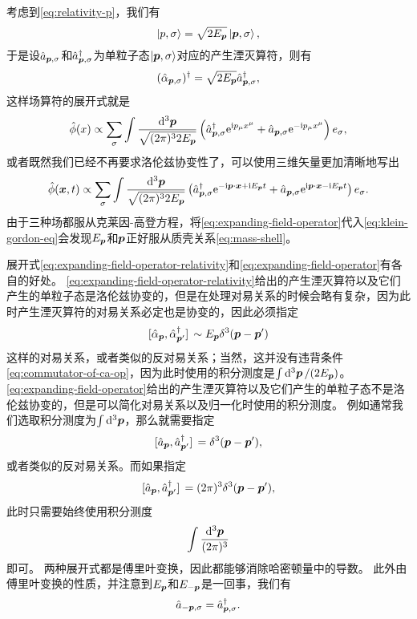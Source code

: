 \documentclass[hyperref, UTF8, a4paper]{ctexart}
\newcommand*{\ii}{\mathrm{i}}
\newcommand*{\ee}{\mathrm{e}}
\begin{document}
考虑到\eqref{eq:relativity-p}，我们有
\[
    \ket{p, \sigma} = \sqrt{2 E_{\vb*{p}}} \ket{\vb*{p}, \sigma},
\]
于是设$\hat{a}_{\vb*{p}, \sigma}$和$\hat{a}^\dagger_{\vb*{p}, \sigma}$为单粒子态$\ket{\vb*{p}, \sigma}$对应的产生湮灭算符，则有
\[
    (\hat{\alpha}_{\vb*{p}, \sigma})^\dagger = \sqrt{2E_{\vb*{p}}} \hat{a}_{\vb*{p}, \sigma}^\dagger,
\]
这样场算符的展开式就是
\[
    \hat{\phi}(x) \propto \sum_\sigma \int \frac{\dd[3]{\vb*{p}}}{\sqrt{(2\pi)^3 2 E_{\vb*{p}}}} \left( \hat{a}^\dagger_{\vb*{p}, \sigma} \ee^{\ii p_\mu x^\mu} + \hat{a}_{\vb*{p}, \sigma} \ee^{- \ii p_\mu x^\mu} \right) e_\sigma,
\]
或者既然我们已经不再要求洛伦兹协变性了，可以使用三维矢量更加清晰地写出
\begin{equation}
    \hat{\phi}(\vb*{x}, t) \propto \sum_\sigma \int \frac{\dd[3]{\vb*{p}}}{\sqrt{(2\pi)^3 2 E_{\vb*{p}}}} \left( \hat{a}^\dagger_{\vb*{p}, \sigma} \ee^{- \ii \vb*{p} \cdot \vb*{x} + \ii E_{\vb*{p}} t} + \hat{a}_{\vb*{p}, \sigma} \ee^{\ii \vb*{p} \cdot \vb*{x} - \ii E_{\vb*{p}} t} \right) e_\sigma. 
    \label{eq:expanding-field-operator}
\end{equation}
由于三种场都服从克莱因-高登方程，将\eqref{eq:expanding-field-operator}代入\eqref{eq:klein-gordon-eq}会发现$E_{\vb*{p}}$和$\vb*{p}$正好服从质壳关系\eqref{eq:mass-shell}。

展开式\eqref{eq:expanding-field-operator-relativity}和\eqref{eq:expanding-field-operator}有各自的好处。
\eqref{eq:expanding-field-operator-relativity}给出的产生湮灭算符以及它们产生的单粒子态是洛伦兹协变的，但是在处理对易关系的时候会略有复杂，因为此时产生湮灭算符的对易关系必定也是协变的，因此必须指定
\[
    \comm*{\hat{\alpha}_{\vb*{p}}}{\hat{\alpha}^\dagger_{\vb*{p}'}} \sim E_{\vb*{p}} \delta^3 (\vb*{p} - \vb*{p}')
\]
这样的对易关系，或者类似的反对易关系；当然，这并没有违背条件\eqref{eq:commutator-of-ca-op}，因为此时使用的积分测度是$\int \dd[3]{\vb*{p}} / (2 E_{\vb*{p}})$。
\eqref{eq:expanding-field-operator}给出的产生湮灭算符以及它们产生的单粒子态不是洛伦兹协变的，但是可以简化对易关系以及归一化时使用的积分测度。
例如通常我们选取积分测度为$\int \dd[3]{\vb*{p}}$，那么就需要指定
\[
    \comm*{\hat{a}_{\vb*{p}}}{\hat{a}^\dagger_{\vb*{p}'}} = \delta^3 (\vb*{p} - \vb*{p}'),
\]
或者类似的反对易关系。而如果指定
\[
    \comm*{\hat{a}_{\vb*{p}}}{\hat{a}^\dagger_{\vb*{p}'}} = (2\pi)^3 \delta^3 (\vb*{p} - \vb*{p}'),
\]
此时只需要始终使用积分测度
\[
    \int \frac{\dd[3]{\vb*{p}}}{(2\pi)^3}
\]
即可。
两种展开式都是傅里叶变换，因此都能够消除哈密顿量中的导数。
此外由傅里叶变换的性质，并注意到$E_{\vb*{p}}$和$E_{-\vb*{p}}$是一回事，我们有
\begin{equation}
    \hat{a}_{-\vb*{p}, \sigma} = \hat{a}_{\vb*{p}, \sigma}^\dagger.
\end{equation}
\end{document}
